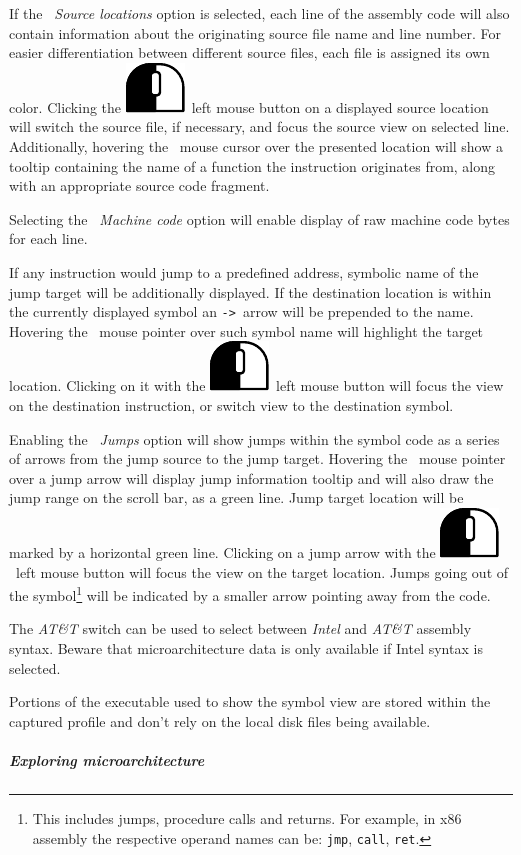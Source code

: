 \documentclass[hidelinks,titlepage,a4paper]{article}
\newcommand{\LMB}{\includegraphics[height=.8\baselineskip]{icons/lmb}}
\begin{document}
If the \emph{\faFileImport{}~Source locations} option is selected, each line of the assembly code will also contain information about the originating source file name and line number. For easier differentiation between different source files, each file is assigned its own color. Clicking the \LMB{}~left mouse button on a displayed source location will switch the source file, if necessary, and focus the source view on selected line. Additionally, hovering the \faMousePointer{}~mouse cursor over the presented location will show a tooltip containing the name of a function the instruction originates from, along with an appropriate source code fragment.

Selecting the \emph{\faCogs{}~Machine code} option will enable display of raw machine code bytes for each line.

If any instruction would jump to a predefined address, symbolic name of the jump target will be additionally displayed. If the destination location is within the currently displayed symbol an \texttt{->}~arrow will be prepended to the name. Hovering the \faMousePointer{}~mouse pointer over such symbol name will highlight the target location. Clicking on it with the \LMB{}~left mouse button will focus the view on the destination instruction, or switch view to the destination symbol.

Enabling the \emph{\faShare{}~Jumps} option will show jumps within the symbol code as a series of arrows from the jump source to the jump target. Hovering the \faMousePointer{}~mouse pointer over a jump arrow will display jump information tooltip and will also draw the jump range on the scroll bar, as a green line. Jump target location will be marked by a horizontal green line. Clicking on a jump arrow with the \LMB{}~left mouse button will focus the view on the target location. Jumps going out of the symbol\footnote{This includes jumps, procedure calls and returns. For example, in x86 assembly the respective operand names can be: \texttt{jmp}, \texttt{call}, \texttt{ret}.} will be indicated by a smaller arrow pointing away from the code.

The \emph{AT\&T} switch can be used to select between \emph{Intel} and \emph{AT\&T} assembly syntax. Beware that microarchitecture data is only available if Intel syntax is selected.

Portions of the executable used to show the symbol view are stored within the captured profile and don't rely on the local disk files being available.

\subparagraph{Exploring microarchitecture}
\end{document}
